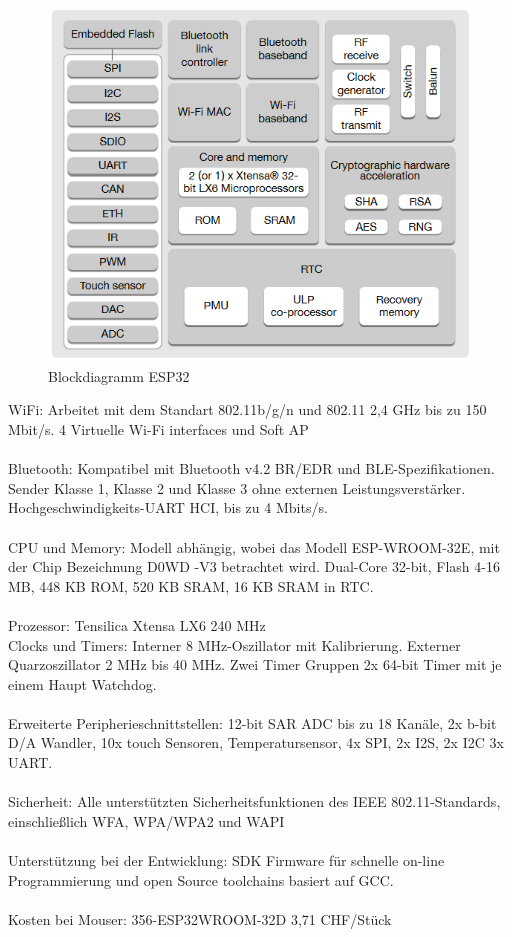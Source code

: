 \begin{figure}[H]
	\centering
	\includegraphics[width=\textwidth]{graphics/blockdiagrammESP32.PNG}
	\caption{Blockdiagramm ESP32 \cite{espressif_esp32-wroom-32_datasheet_en_2019}}
	
	\label{pic: blockdiagrammESP32}
\end{figure} 

WiFi:
Arbeitet mit dem Standart 802.11b/g/n und 802.11 2,4 GHz bis zu 150 Mbit/s. 4 Virtuelle Wi-Fi interfaces und Soft AP \\
\\
Bluetooth:
Kompatibel mit Bluetooth v4.2 BR/EDR und BLE-Spezifikationen. Sender Klasse 1, Klasse 2 und Klasse 3 ohne externen Leistungsverstärker. Hochgeschwindigkeits-UART HCI, bis zu 4 Mbits/s.\\
\\
CPU und Memory:
Modell abhängig, wobei das Modell ESP-WROOM-32E, mit der Chip Bezeichnung D0WD -V3 betrachtet wird. Dual-Core 32-bit, Flash 4-16 MB, 448 KB ROM, 520 KB SRAM, 16 KB SRAM in RTC. \\
\\
Prozessor:
Tensilica Xtensa LX6 240 MHz
\\
Clocks und Timers:
Interner 8 MHz-Oszillator mit Kalibrierung. Externer Quarzoszillator 2 MHz bis 40 MHz. Zwei Timer Gruppen 2x 64-bit Timer mit je einem Haupt Watchdog.\\
\\
Erweiterte Peripherieschnittstellen:
12-bit SAR ADC bis zu 18 Kanäle, 2x b-bit D/A Wandler, 10x touch Sensoren, Temperatursensor, 4x SPI, 2x I2S, 2x I2C 3x UART.\\
\\
Sicherheit:
Alle unterstützten Sicherheitsfunktionen des IEEE 802.11-Standards, einschließlich WFA, WPA/WPA2 und WAPI\\
\\
Unterstützung bei der Entwicklung:
SDK Firmware für schnelle on-line Programmierung und open Source toolchains basiert auf GCC.\\
\\
Kosten bei Mouser:
356-ESP32WROOM-32D 3,71 CHF/Stück
\newpage
